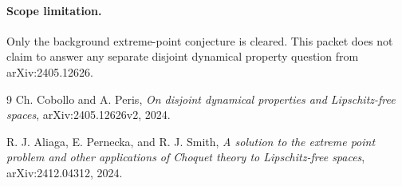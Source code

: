 \documentclass[11pt]{article}
\begin{document}
\paragraph{Scope limitation.}
Only the background extreme-point conjecture is cleared.  This packet does not
claim to answer any separate disjoint dynamical property question from
arXiv:2405.12626.

\begin{thebibliography}{9}
Ch. Cobollo and A. Peris,
\emph{On disjoint dynamical properties and Lipschitz-free spaces},
arXiv:2405.12626v2, 2024.

R. J. Aliaga, E. Pernecka, and R. J. Smith,
\emph{A solution to the extreme point problem and other applications of Choquet
theory to Lipschitz-free spaces},
arXiv:2412.04312, 2024.
\end{thebibliography}
\end{document}
